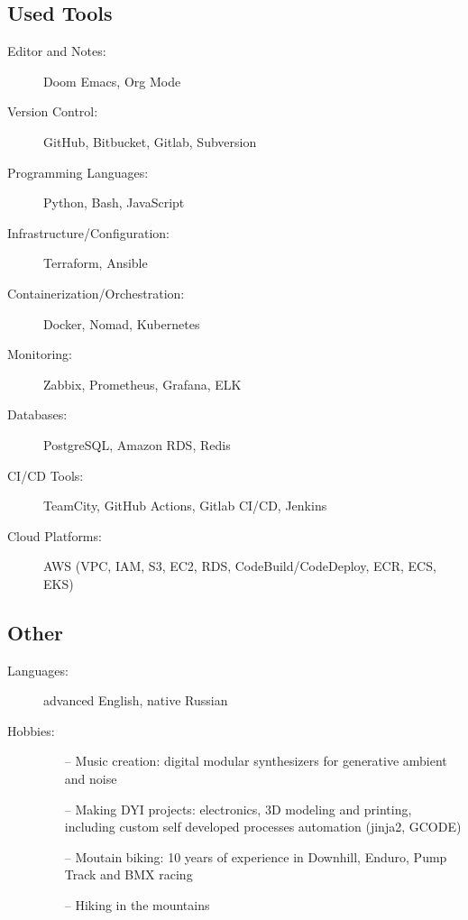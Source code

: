 \documentclass[10pt]{report}
\begin{document}
\subsection*{Used Tools}
\begin{description}
  \item[Editor and Notes:]
        Doom Emacs, Org Mode
  \item[Version Control:]
        GitHub, Bitbucket, Gitlab, Subversion
  \item[Programming Languages:]
        Python, Bash, JavaScript
  \item[Infrastructure/Configuration:]
        Terraform, Ansible
  \item[Containerization/Orchestration:]
        Docker, Nomad, Kubernetes
  \item[Monitoring:]
        Zabbix, Prometheus, Grafana, ELK
  \item[Databases:]
        PostgreSQL, Amazon RDS, Redis
  \item[CI/CD Tools:]
        TeamCity, GitHub Actions, Gitlab CI/CD, Jenkins
  \item[Cloud Platforms:]
        AWS (VPC, IAM, S3, EC2, RDS, CodeBuild/CodeDeploy, ECR, ECS, EKS)
\end{description}

\subsection*{Other}
\begin{description}
  \item[Languages:]
        advanced English, native Russian
  \item[Hobbies:]
        \begin{itemize}
          \item[]
          \item[--] Music creation: digital modular synthesizers for generative ambient and noise
          \item[--] Making DYI projects: electronics, 3D modeling and printing, including custom self developed processes automation (jinja2, GCODE)
          \item[--] Moutain biking: 10 years of experience in Downhill, Enduro, Pump Track and BMX racing
          \item[--] Hiking in the mountains
        \end{itemize}

\end{description}
\end{document}
